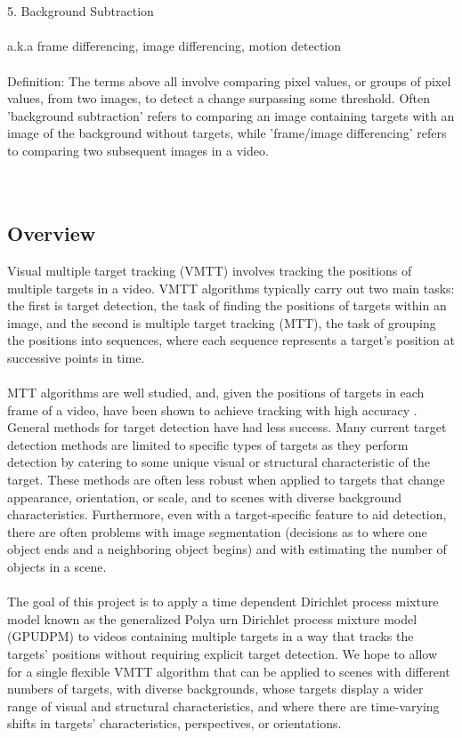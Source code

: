 \documentclass{article}
\begin{document}
\\
\\
5. Background Subtraction\\
\\
a.k.a frame differencing, image differencing, motion detection \\
\\
Definition: The terms above all involve comparing pixel values, or groups of pixel values, from two images, to detect a change surpassing some threshold. Often 'background subtraction' refers to comparing an image containing targets with an image of the background without targets, while 'frame/image differencing' refers to comparing two subsequent images in a video. \\
\\
\\




\subsection*{Overview}
\vspace{6pt}
Visual multiple target tracking (VMTT) involves tracking the positions of multiple targets in a video. VMTT algorithms typically carry out two main tasks: the first is target detection, the task of finding the positions of targets within an image, and the second is multiple target tracking (MTT), the task of grouping the positions into sequences, where each sequence represents a target's position at successive points in time. \\
\\
MTT algorithms are well studied, and, given the positions of targets in each frame of a video, have been shown to achieve tracking with high accuracy \cite{blackman_2004}. General methods for target detection have had less success. Many current target detection methods are limited to specific types of targets as they perform detection by catering to some unique visual or structural characteristic of the target. These methods are often less robust when applied to targets that change appearance, orientation, or scale, and to scenes with diverse background characteristics. Furthermore, even with a target-specific feature to aid detection, there are often problems with image segmentation (decisions as to where one object ends and a neighboring object begins) and with estimating the number of objects in a scene.  \\
\\
The goal of this project is to apply a time dependent Dirichlet process mixture model known as the generalized Polya urn Dirichlet process mixture model (GPUDPM) to videos containing multiple targets in a way that tracks the targets' positions without requiring explicit target detection. We hope to allow for a 	single flexible VMTT algorithm that can be applied to scenes with different numbers of targets, with diverse backgrounds, whose targets display a wider range of visual and structural characteristics, and where there are time-varying shifts in targets' characteristics, perspectives, or orientations.\\
\end{document}
